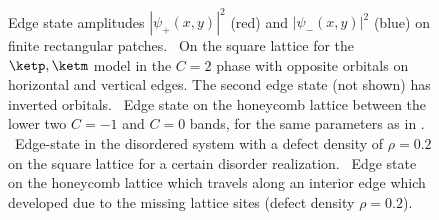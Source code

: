 \begin{figure}[t]
    \centering
    \hspace{1.5cm}
     \\
    \hspace{1.5cm}
    \caption{Edge state amplitudes $|\psi_+(x,y)|^2$ (red) and $|\psi_-(x,y)|^2$ (blue) on finite rectangular patches. \sfA~On the square lattice for the $\ketp, \ketm$ model in the $C=2$ phase with opposite orbitals on horizontal and vertical edges. The second edge state (not shown) has inverted orbitals. \sfB~Edge state on the honeycomb lattice between the lower two $C=-1$ and $C=0$ bands, for the same parameters as in . \sfC~Edge-state in the disordered system with a defect density of $\rho= 0.2$ on the square lattice for a certain disorder realization. \sfD~Edge state on the honeycomb lattice which travels along an interior edge which developed due to the missing lattice sites (defect density $\rho=0.2$).}
\end{figure}

